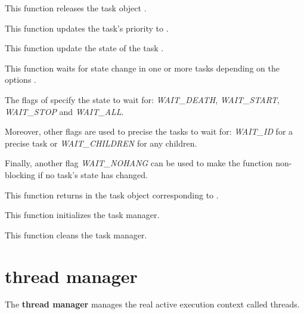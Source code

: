 	 {
	   This function releases the task object .
	 }

	 {
	   This function updates the task's priority to .
	 }

	 {
	   This function update the state of the task .

	 }

	 {
	   This function waits for state change in one or more tasks
	   depending on the options .

	   The flags of  specify the state to wait for:
	   \textit{WAIT\_DEATH}, \textit{WAIT\_START},
	   \textit{WAIT\_STOP} and \textit{WAIT\_ALL}.

	   Moreover, other flags are used to precise the tasks to wait for:
	   \textit{WAIT\_ID} for a precise task  or
	   \textit{WAIT\_CHILDREN} for any children.

	   Finally, another flag \textit{WAIT\_NOHANG} can be used
	   to make the function non-blocking if no task's state has changed.


	 }

	 {
	   This function returns in  the task object corresponding
	   to .
	 }

	 {
	   This function initializes the task manager.
	 }

	 {
	   This function cleans the task manager.
	 }

%
%

\section{thread manager}

The \textbf{thread manager} manages the real active execution context
called threads.

